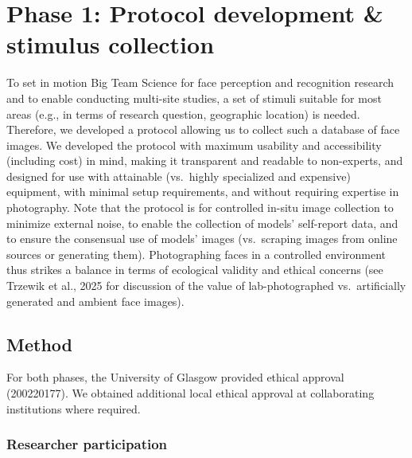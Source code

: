 \documentclass[
  letterpaper,
  DIV=11,
  numbers=noendperiod]{scrartcl}
\begin{document}
\section{Phase 1: Protocol development \& stimulus
collection}\label{phase-1-protocol-development-stimulus-collection}

To set in motion Big Team Science for face perception and recognition
research and to enable conducting multi-site studies, a set of stimuli
suitable for most areas (e.g., in terms of research question, geographic
location) is needed. Therefore, we developed a protocol allowing us to
collect such a database of face images. We developed the protocol with
maximum usability and accessibility (including cost) in mind, making it
transparent and readable to non-experts, and designed for use with
attainable (vs.~highly specialized and expensive) equipment, with
minimal setup requirements, and without requiring expertise in
photography. Note that the protocol is for controlled in-situ image
collection to minimize external noise, to enable the collection of
models' self-report data, and to ensure the consensual use of models'
images (vs.~scraping images from online sources or generating them).
Photographing faces in a controlled environment thus strikes a balance
in terms of ecological validity and ethical concerns (see Trzewik et
al., 2025 for discussion of the value of lab-photographed
vs.~artificially generated and ambient face images).

\subsection{Method}\label{method}

For both phases, the University of Glasgow provided ethical approval
(200220177). We obtained additional local ethical approval at
collaborating institutions where required.

\subsubsection{Researcher participation}\label{researcher-participation}
\end{document}
